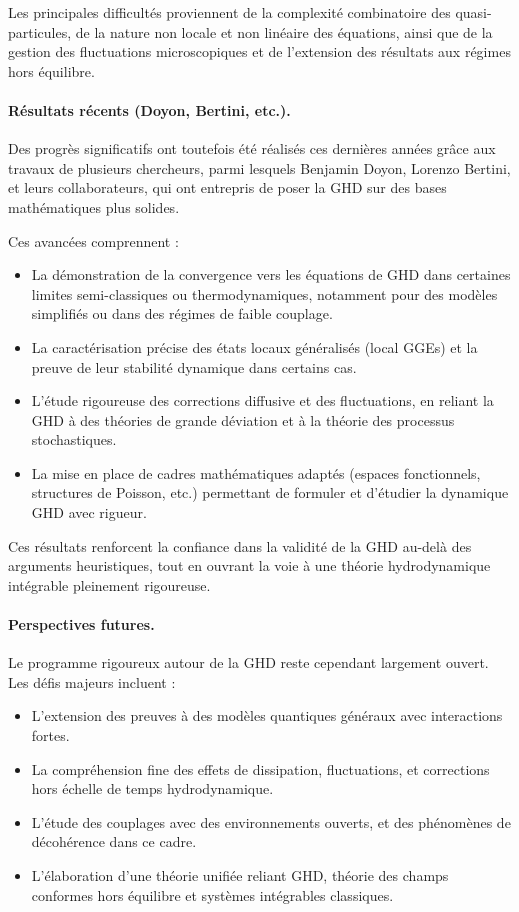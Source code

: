 Les principales difficultés proviennent de la complexité combinatoire des quasi-particules, de la nature non locale et non linéaire des équations, ainsi que de la gestion des fluctuations microscopiques et de l’extension des résultats aux régimes hors équilibre.

\paragraph{Résultats récents (Doyon, Bertini, etc.).}
Des progrès significatifs ont toutefois été réalisés ces dernières années grâce aux travaux de plusieurs chercheurs, parmi lesquels Benjamin Doyon, Lorenzo Bertini, et leurs collaborateurs, qui ont entrepris de poser la GHD sur des bases mathématiques plus solides.

Ces avancées comprennent :
\begin{itemize}
    \item La démonstration de la convergence vers les équations de GHD dans certaines limites semi-classiques ou thermodynamiques, notamment pour des modèles simplifiés ou dans des régimes de faible couplage.
    \item La caractérisation précise des états locaux généralisés (local GGEs) et la preuve de leur stabilité dynamique dans certains cas.
    \item L’étude rigoureuse des corrections diffusive et des fluctuations, en reliant la GHD à des théories de grande déviation et à la théorie des processus stochastiques.
    \item La mise en place de cadres mathématiques adaptés (espaces fonctionnels, structures de Poisson, etc.) permettant de formuler et d’étudier la dynamique GHD avec rigueur.
\end{itemize}

Ces résultats renforcent la confiance dans la validité de la GHD au-delà des arguments heuristiques, tout en ouvrant la voie à une théorie hydrodynamique intégrable pleinement rigoureuse.

\paragraph{Perspectives futures.}
Le programme rigoureux autour de la GHD reste cependant largement ouvert. Les défis majeurs incluent :
\begin{itemize}
    \item L’extension des preuves à des modèles quantiques généraux avec interactions fortes.
    \item La compréhension fine des effets de dissipation, fluctuations, et corrections hors échelle de temps hydrodynamique.
    \item L’étude des couplages avec des environnements ouverts, et des phénomènes de décohérence dans ce cadre.
    \item L’élaboration d’une théorie unifiée reliant GHD, théorie des champs conformes hors équilibre et systèmes intégrables classiques.
\end{itemize}

